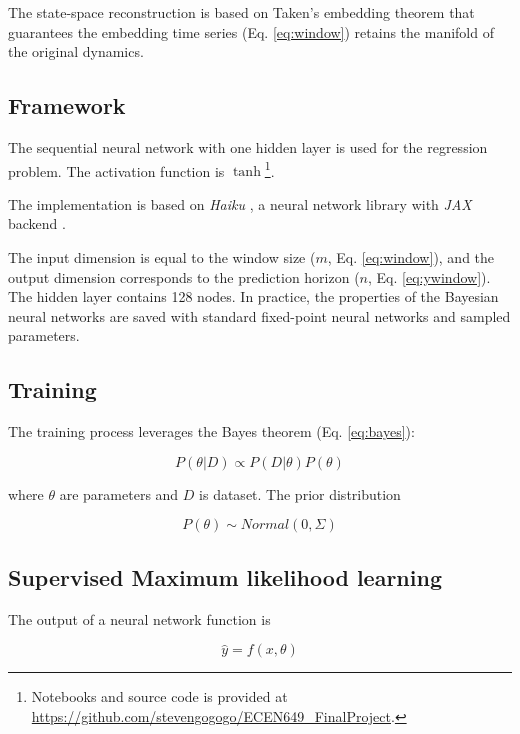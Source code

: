 \documentclass{article}
\begin{document}
The state-space reconstruction is based on Taken's embedding theorem that guarantees the embedding time series (Eq. \ref{eq:window}) retains the manifold of the original dynamics\citep{takens1981detecting}.

\subsection{Framework}

The sequential neural network with one hidden layer is used for the regression problem. The activation function is $\tanh$\footnote{Notebooks and source code is provided at \url{https://github.com/stevengogogo/ECEN649_FinalProject}.}.

The implementation is based on \textit{Haiku} \citep{haiku2020github}, a neural network library with \textit{JAX} backend \citep{jax2018github}.


The input dimension is equal to the window size ($m$, Eq. \ref{eq:window}), and the output dimension corresponds to the prediction horizon ($n$, Eq. \ref{eq:ywindow}). The hidden layer contains 128 nodes. In practice, the properties of the Bayesian neural networks are saved with standard fixed-point neural networks and sampled parameters.


\subsection{Training}

The training process leverages the Bayes theorem (Eq. \ref{eq:bayes}):

\begin{equation}
P(\theta | D) \propto P(D|\theta) P(\theta)
\label{eq:bayes}
\end{equation}

where $\theta$ are parameters and $D$ is dataset. The prior distribution 

\begin{equation}
P(\theta) \sim Normal(0, \Sigma)
\label{eq:weight-prior}
\end{equation}


\subsection{Supervised Maximum likelihood learning}

The output of a neural network function is 

\begin{equation}
    \hat{y} = f(x, \theta)
    \label{eq:net-output}
\end{equation}
\end{document}
